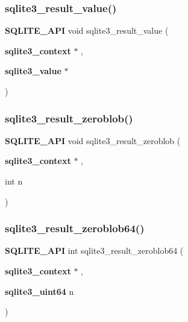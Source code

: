 \mbox{\label{sqlite3_8h_af572c2d6f23377fc4d794b6946d5b3ed}} 
\subsubsection{sqlite3\_result\_value()}
{\footnotesize\ttfamily \textbf{ S\+Q\+L\+I\+T\+E\+\_\+\+A\+PI} void sqlite3\+\_\+result\+\_\+value (\begin{DoxyParamCaption}\item[{\textbf{ sqlite3\+\_\+context} $\ast$}]{,  }\item[{\textbf{ sqlite3\+\_\+value} $\ast$}]{ }\end{DoxyParamCaption})}

\mbox{\label{sqlite3_8h_a0ffef291404e00066251301244d0616d}} 
\subsubsection{sqlite3\_result\_zeroblob()}
{\footnotesize\ttfamily \textbf{ S\+Q\+L\+I\+T\+E\+\_\+\+A\+PI} void sqlite3\+\_\+result\+\_\+zeroblob (\begin{DoxyParamCaption}\item[{\textbf{ sqlite3\+\_\+context} $\ast$}]{,  }\item[{int}]{n }\end{DoxyParamCaption})}

\mbox{\label{sqlite3_8h_ab03c5daa2ea52b4e6a225f298285040b}} 
\subsubsection{sqlite3\_result\_zeroblob64()}
{\footnotesize\ttfamily \textbf{ S\+Q\+L\+I\+T\+E\+\_\+\+A\+PI} int sqlite3\+\_\+result\+\_\+zeroblob64 (\begin{DoxyParamCaption}\item[{\textbf{ sqlite3\+\_\+context} $\ast$}]{,  }\item[{\textbf{ sqlite3\+\_\+uint64}}]{n }\end{DoxyParamCaption})}

